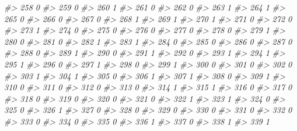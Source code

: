 \documentclass[]{book}
\newenvironment{Shaded}{\begin{snugshade}}{\end{snugshade}}
\newcommand{\CommentTok}[1]{\textcolor[rgb]{0.56,0.35,0.01}{\textit{#1}}}
\begin{document}
\begin{Shaded}
\begin{Highlighting}[]
\CommentTok{#> 258           0}
\CommentTok{#> 259           0}
\CommentTok{#> 260           1}
\CommentTok{#> 261           0}
\CommentTok{#> 262           0}
\CommentTok{#> 263           1}
\CommentTok{#> 264           1}
\CommentTok{#> 265           0}
\CommentTok{#> 266           0}
\CommentTok{#> 267           0}
\CommentTok{#> 268           1}
\CommentTok{#> 269           1}
\CommentTok{#> 270           1}
\CommentTok{#> 271           0}
\CommentTok{#> 272           0}
\CommentTok{#> 273           1}
\CommentTok{#> 274           0}
\CommentTok{#> 275           0}
\CommentTok{#> 276           0}
\CommentTok{#> 277           0}
\CommentTok{#> 278           0}
\CommentTok{#> 279           1}
\CommentTok{#> 280           0}
\CommentTok{#> 281           0}
\CommentTok{#> 282           1}
\CommentTok{#> 283           1}
\CommentTok{#> 284           0}
\CommentTok{#> 285           0}
\CommentTok{#> 286           0}
\CommentTok{#> 287           0}
\CommentTok{#> 288           0}
\CommentTok{#> 289           1}
\CommentTok{#> 290           0}
\CommentTok{#> 291           1}
\CommentTok{#> 292           0}
\CommentTok{#> 293           1}
\CommentTok{#> 294           1}
\CommentTok{#> 295           1}
\CommentTok{#> 296           0}
\CommentTok{#> 297           1}
\CommentTok{#> 298           0}
\CommentTok{#> 299           1}
\CommentTok{#> 300           0}
\CommentTok{#> 301           0}
\CommentTok{#> 302           0}
\CommentTok{#> 303           1}
\CommentTok{#> 304           1}
\CommentTok{#> 305           0}
\CommentTok{#> 306           1}
\CommentTok{#> 307           1}
\CommentTok{#> 308           0}
\CommentTok{#> 309           1}
\CommentTok{#> 310           0}
\CommentTok{#> 311           0}
\CommentTok{#> 312           0}
\CommentTok{#> 313           0}
\CommentTok{#> 314           1}
\CommentTok{#> 315           1}
\CommentTok{#> 316           0}
\CommentTok{#> 317           0}
\CommentTok{#> 318           0}
\CommentTok{#> 319           0}
\CommentTok{#> 320           0}
\CommentTok{#> 321           0}
\CommentTok{#> 322           1}
\CommentTok{#> 323           1}
\CommentTok{#> 324           0}
\CommentTok{#> 325           0}
\CommentTok{#> 326           1}
\CommentTok{#> 327           0}
\CommentTok{#> 328           0}
\CommentTok{#> 329           0}
\CommentTok{#> 330           0}
\CommentTok{#> 331           0}
\CommentTok{#> 332           0}
\CommentTok{#> 333           0}
\CommentTok{#> 334           0}
\CommentTok{#> 335           0}
\CommentTok{#> 336           1}
\CommentTok{#> 337           0}
\CommentTok{#> 338           1}
\CommentTok{#> 339           1}

\end{Highlighting}
\end{Shaded}
\end{document}
